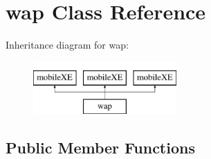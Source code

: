 \hypertarget{classwap}{}\section{wap Class Reference}
\label{classwap}
Inheritance diagram for wap\+:\begin{figure}[H]
\begin{center}
\leavevmode
\includegraphics[height=2.000000cm]{classwap}
\end{center}
\end{figure}
\subsection*{Public Member Functions}
